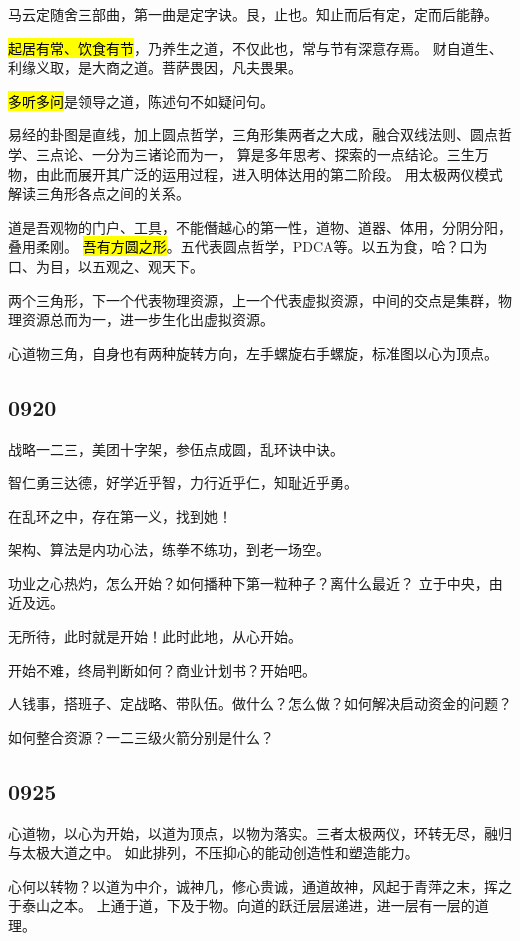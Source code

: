 马云定随舍三部曲，第一曲是定字诀。艮，止也。知止而后有定，定而后能静。

\hl{起居有常、饮食有节}，乃养生之道，不仅此也，常与节有深意存焉。
财自道生、利缘义取，是大商之道。菩萨畏因，凡夫畏果。

\hl{多听多问}是领导之道，陈述句不如疑问句。

易经的卦图是直线，加上圆点哲学，三角形集两者之大成，融合双线法则、圆点哲学、三点论、一分为三诸论而为一，
算是多年思考、探索的一点结论。三生万物，由此而展开其广泛的运用过程，进入明体达用的第二阶段。
用太极两仪模式解读三角形各点之间的关系。

道是吾观物的门户、工具，不能僭越心的第一性，道物、道器、体用，分阴分阳，叠用柔刚。
\hl{吾有方圆之形}。五代表圆点哲学，PDCA等。以五为食，哈？口为口、为目，以五观之、观天下。

两个三角形，下一个代表物理资源，上一个代表虚拟资源，中间的交点是集群，物理资源总而为一，进一步生化出虚拟资源。

心道物三角，自身也有两种旋转方向，左手螺旋右手螺旋，标准图以心为顶点。

\subsection{0920}

战略一二三，美团十字架，参伍点成圆，乱环诀中诀。

智仁勇三达德，好学近乎智，力行近乎仁，知耻近乎勇。

在乱环之中，存在第一义，找到她！

架构、算法是内功心法，练拳不练功，到老一场空。

功业之心热灼，怎么开始？如何播种下第一粒种子？离什么最近？ 立于中央，由近及远。

无所待，此时就是开始！此时此地，从心开始。

开始不难，终局判断如何？商业计划书？开始吧。

人钱事，搭班子、定战略、带队伍。做什么？怎么做？如何解决启动资金的问题？

如何整合资源？一二三级火箭分别是什么？

\subsection{0925}

心道物，以心为开始，以道为顶点，以物为落实。三者太极两仪，环转无尽，融归与太极大道之中。
如此排列，不压抑心的能动创造性和塑造能力。

心何以转物？以道为中介，诚神几，修心贵诚，通道故神，风起于青萍之末，挥之于泰山之本。
上通于道，下及于物。向道的跃迁层层递进，进一层有一层的道理。

